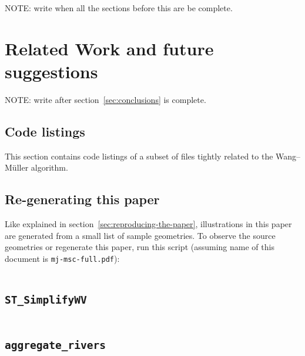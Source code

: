 \documentclass[a4paper]{article}
\newcommand{\inputcode}[2]{\inputminted[fontsize=\small]{#1}{#2}}
\newcommand{\inputcode}[2]{}
\newcommand{\WM}{Wang--M{\"u}ller}
\begin{document}
NOTE: write when all the sections before this are be complete.

\section{Related Work and future suggestions}
\label{sec:related_work}

NOTE: write after section~\ref{sec:conclusions} is complete.

\printbibliography

\begin{appendices}

\section{Code listings}

This section contains code listings of a subset of files tightly related to the
    {\WM} algorithm.

\subsection{Re-generating this paper}
\label{sec:code-regenerate}

Like explained in section~\ref{sec:reproducing-the-paper}, illustrations in
    this paper are generated from a small list of sample geometries. To observe
    the source geometries or regenerate this paper, run this script (assuming
    name of this document is {\tt mj-msc-full.pdf}):

\inputcode{bash}{extract-and-generate}

\subsection{\texttt{ST\_SimplifyWV}}
\inputcode{postgresql}{wm.sql}

\subsection{\texttt{aggregate\_rivers}}
\inputcode{postgresql}{aggregate-rivers.sql}

\end{appendices}
\end{document}
